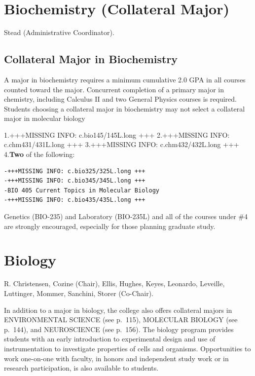 \documentclass[
  letterpaper,
]{scrbook}
\begin{document}
\section{Biochemistry (Collateral Major)}\label{sec-biochemistry}

Stead (Administrative Coordinator).

\subsection{Collateral Major in
Biochemistry}\label{collateral-major-in-biochemistry}

A major in biochemistry requires a minimum cumulative 2.0 GPA in all
courses counted toward the major. Concurrent completion of a primary
major in chemistry, including Calculus II and two General Physics
courses is required. Students choosing a collateral major in
biochemistry may not select a collateral major in molecular biology

1.+++MISSING INFO: c.bio145/145L.long +++ 2.+++MISSING INFO:
c.chm431/431L.long +++ 3.+++MISSING INFO: c.chm432/432L.long +++
4.\textbf{Two} of the following:

\begin{verbatim}
-+++MISSING INFO: c.bio325/325L.long +++
-+++MISSING INFO: c.bio345/345L.long +++
-BIO 405 Current Topics in Molecular Biology
-+++MISSING INFO: c.bio435/435L.long +++
\end{verbatim}

Genetics (BIO-235) and Laboratory (BIO-235L) and all of the courses
under \#4 are strongly encouraged, especially for those planning
graduate study.

\section{Biology}\label{sec-biology}

R. Christensen, Cozine (Chair), Ellis, Hughes, Keyes, Leonardo,
Leveille, Luttinger, Mommer, Sanchini, Storer (Co-Chair).

In addition to a major in biology, the college also offers collateral
majors in ENVIRONMENTAL SCIENCE (see p.~115), MOLECULAR BIOLOGY (see
p.~144), and NEUROSCIENCE (see p.~156). The biology program provides
students with an early introduction to experimental design and use of
instrumentation to investigate properties of cells and organisms.
Opportunities to work one-on-one with faculty, in honors and independent
study work or in research participation, is also available to students.
\end{document}
